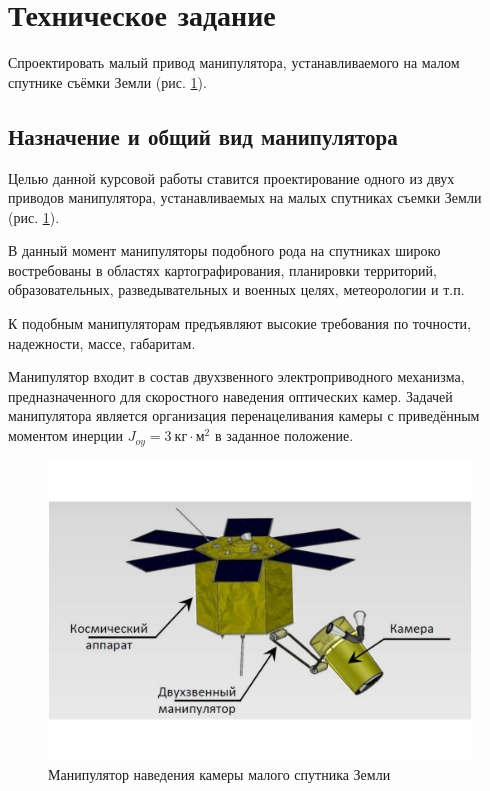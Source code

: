 \ifdefined\DIPLOMA
    \section{Техническое задание}

    Спроектировать малый привод манипулятора, устанавливаемого на малом спутнике
    съёмки Земли (рис. \ref{sattelite_general_view}).
\else
    \subsection{Назначение и общий вид манипулятора}

    Целью данной курсовой работы ставится проектирование одного из двух
    приводов манипулятора, устанавливаемых на малых спутниках съемки Земли
    (рис. \ref{sattelite_general_view}).

    В данный момент манипуляторы подобного рода на спутниках широко востребованы
    в областях картографирования, планировки территорий, образовательных,
    разведывательных и военных целях, метеорологии и т.п.

    К подобным манипуляторам предъявляют высокие требования по точности,
    надежности, массе, габаритам.
\fi

Манипулятор входит в состав двухзвенного электроприводного механизма,
предназначенного для скоростного наведения оптических камер.
Задачей манипулятора является организация перенацеливания камеры с приведённым
моментом инерции $J_{oy} = 3 ~\text{кг} \cdot \text{м}^2$ в заданное положение.

\begin{figure}[h!]
    \centering
    \includegraphics[width=\textwidth, keepaspectratio, clip=true, trim=3cm 3cm 3cm 3cm]
                    {./src/pictures/sattelite_3d_images/general_view}
    \caption{Манипулятор наведения камеры малого спутника Земли}
    \label{sattelite_general_view}
\end{figure}

